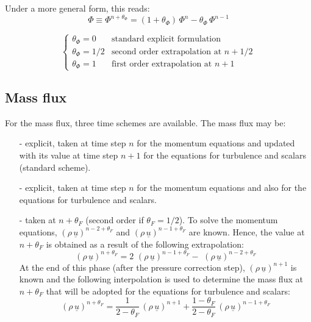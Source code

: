 Under a more general form, this reads:
\begin{equation}
\Phi \equiv \Phi^{n+\theta_{\Phi}}=(1+\theta_{\Phi})\,\Phi^{n}-
\theta_{\Phi}\,\Phi^{n-1}
\end{equation}

\begin{equation}
\left\{%
\begin{array}{ll}
\theta_{\Phi} = 0 & \text{standard explicit formulation} \\
\theta_{\Phi} = 1/2 & \text{second order extrapolation at } n+1/2 \\
\theta_{\Phi} = 1 & \text{first order extrapolation at } n+1%
\end{array}
\right.
\end{equation}

\subsection*{Mass flux}

For the mass flux, three time schemes are available. The mass flux may be:

\begin{itemize}
\item[-] explicit, taken at time step $n$ for the momentum equations and
updated with its value at time step $n+1$ for the equations for turbulence
and scalars (standard scheme).\newline

\item[-] explicit, taken at time step $n$ for the momentum equations and
also for the equations for turbulence and scalars.

\item[-] taken at $n+\theta_{F}$ (second order if $\theta_{F}=1/2$). To
solve the momentum equations, $(\rho\,\underline{u})^{n-2+\theta_{F}}$ and $%
(\rho\,\underline{u})^{n-1+\theta_{F}}$ are known. Hence, the value at $%
n+\theta_{F}$ is obtained as a result of the following extrapolation:
\begin{equation}
(\rho\,\underline{u})^{n+\theta_{F}}= 2\,\,(\rho\,\underline{u}%
)^{n-1+\theta_{F}} -\,\,(\rho\,\underline{u})^{n-2+\theta_{F}}
\end{equation}
At the end of this phase (after the pressure correction step), $(\rho\,%
\underline{u})^{n+1}$ is known and the following interpolation is used to
determine the mass flux at $n+\theta_{F}$ that will be adopted for the
equations for turbulence and scalars:
\begin{equation}
(\rho\,\underline{u})^{n+\theta_{F}}= \frac{1}{2-\theta_{F}}\,(\rho\,%
\underline{u})^{n+1} +\frac{1-\theta_{F}}{2-\theta_{F}}\,(\rho\,\underline{u}%
)^{n-1+\theta_{F}}
\end{equation}
\end{itemize}

